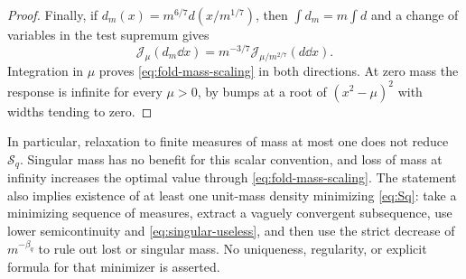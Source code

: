 \begin{proof}
Finally, if $d_m(x)=m^{6/7}d(x/m^{1/7})$, then
$\int d_m=m\int d$ and a change of variables in the test supremum gives
\[
 \mathscr J_\mu(d_m\dd x)
   =m^{-3/7}\mathscr J_{\mu/m^{2/7}}(d\dd x).
\]
Integration in $\mu$ proves \eqref{eq:fold-mass-scaling} in both
directions. At zero mass the response is infinite for every $\mu>0$,
by bumps at a root of $(x^2-\mu)^2$ with widths tending to zero.
\end{proof}

In particular, relaxation to finite measures of mass at most one does
not reduce $\mathcal S_q$. Singular mass has no benefit for this
scalar convention, and loss of mass at infinity increases the
optimal value through \eqref{eq:fold-mass-scaling}. The statement
also implies existence of at least one unit-mass density minimizing
\eqref{eq:Sq}: take a minimizing sequence of measures, extract a
vaguely convergent subsequence, use lower semicontinuity and
\eqref{eq:singular-useless}, and then use the strict decrease of
$m^{-\beta_q}$ to rule out lost or singular mass. No uniqueness,
regularity, or explicit formula for that minimizer is asserted.

